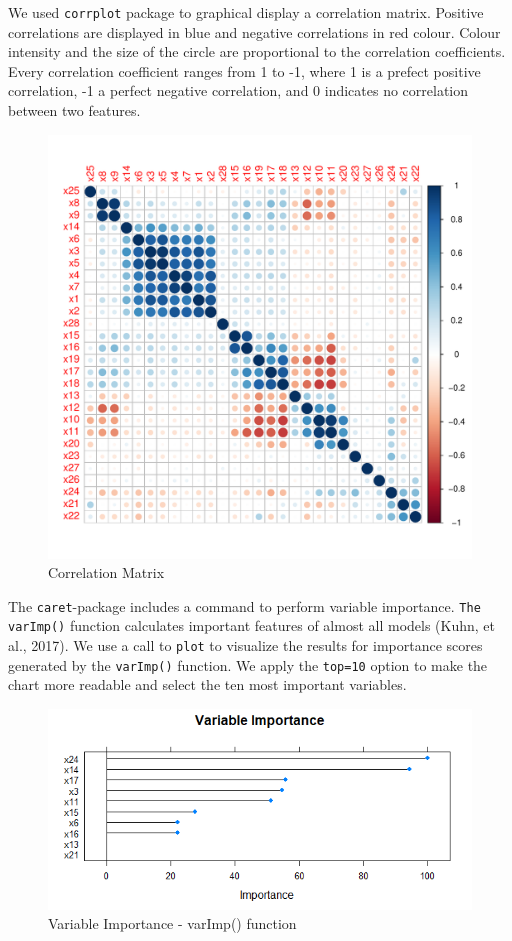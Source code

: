\documentclass{article}
\begin{document}
We used \texttt{corrplot} package to graphical display a correlation matrix. Positive correlations are displayed in blue and negative correlations in red colour. Colour intensity and the size of the circle are proportional to the correlation coefficients. Every correlation coefficient ranges from 1 to -1, where 1 is a prefect positive correlation, -1 a perfect negative correlation, and 0 indicates no correlation between two features.

\begin{figure}
\caption{Correlation Matrix }
\includegraphics[scale=0.8]{../CART/CorrPlot.pdf}
\end{figure}

The \texttt{caret}-package includes a command to perform variable importance. \texttt{The varImp()} function calculates important features of almost all models (Kuhn, et al., 2017). We use a call to \texttt{plot} to visualize the results for importance scores generated by the \texttt{varImp()} function. We apply the \texttt{top=10} option to make the chart more readable and select the ten most important variables.

\begin{figure}
\caption{Variable Importance - varImp() function}
\includegraphics[scale=0.9]{../CART/VarImp_top_10.png}
\end{figure}
\end{document}
